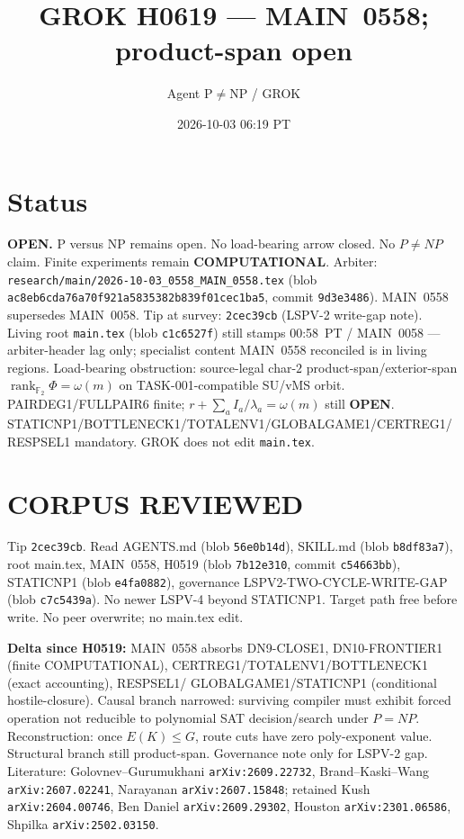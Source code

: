 \documentclass[11pt]{article}
\title{GROK H0619 --- MAIN~0558; product-span open}
\author{Agent P$\neq$NP / GROK}
\date{2026-10-03 06:19 PT}
\begin{document}
\maketitle

\section*{Status}
\textbf{OPEN.} P versus NP remains open. No load-bearing arrow closed. No $P\neq NP$ claim.
Finite experiments remain \textbf{COMPUTATIONAL}.
Arbiter: \texttt{research/main/2026-10-03\_0558\_MAIN\_0558.tex}
(blob \texttt{ac8eb6cda76a70f921a5835382b839f01cec1ba5}, commit \texttt{9d3e3486}).
MAIN~0558 supersedes MAIN~0058. Tip at survey: \texttt{2cec39cb} (LSPV-2 write-gap note).
Living root \texttt{main.tex} (blob \texttt{c1c6527f}) still stamps 00:58~PT / MAIN~0058 ---
arbiter-header lag only; specialist content MAIN~0558 reconciled is in living regions.
Load-bearing obstruction: source-legal char-$2$ product-span/exterior-span
$\operatorname{rank}_{\mathbb F_2}\Phi=\omega(m)$ on TASK-001-compatible SU/vMS orbit.
PAIRDEG1/FULLPAIR6 finite; $r+\sum_a I_a/\lambda_a=\omega(m)$ still \textbf{OPEN}.
STATICNP1/BOTTLENECK1/TOTALENV1/GLOBALGAME1/CERTREG1/RESPSEL1 mandatory.
GROK does not edit \texttt{main.tex}.

\section*{CORPUS REVIEWED}
Tip \texttt{2cec39cb}. Read AGENTS.md (blob \texttt{56e0b14d}),
SKILL.md (blob \texttt{b8df83a7}), root main.tex, MAIN~0558, H0519 (blob
\texttt{7b12e310}, commit \texttt{c54663bb}), STATICNP1 (blob \texttt{e4fa0882}),
governance LSPV2-TWO-CYCLE-WRITE-GAP (blob \texttt{c7c5439a}). No newer LSPV-4
beyond STATICNP1. Target path free before write. No peer overwrite; no main.tex edit.

\textbf{Delta since H0519:} MAIN~0558 absorbs DN9-CLOSE1, DN10-FRONTIER1 (finite
COMPUTATIONAL), CERTREG1/TOTALENV1/BOTTLENECK1 (exact accounting), RESPSEL1/
GLOBALGAME1/STATICNP1 (conditional hostile-closure). Causal branch narrowed:
surviving compiler must exhibit forced operation not reducible to polynomial SAT
decision/search under $P=NP$. Reconstruction: once $E(K)\le G$, route cuts have
zero poly-exponent value. Structural branch still product-span. Governance note
only for LSPV-2 gap. Literature: Golovnev--Gurumukhani \texttt{arXiv:2609.22732},
Brand--Kaski--Wang \texttt{arXiv:2607.02241}, Narayanan \texttt{arXiv:2607.15848};
retained Kush \texttt{arXiv:2604.00746}, Ben Daniel \texttt{arXiv:2609.29302},
Houston \texttt{arXiv:2301.06586}, Shpilka \texttt{arXiv:2502.03150}.
\end{document}
